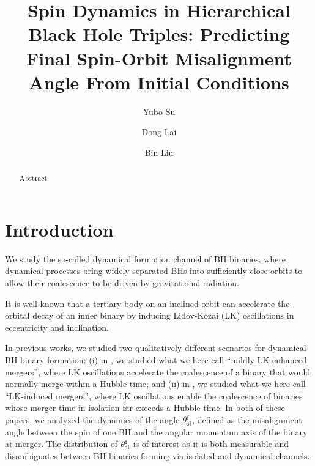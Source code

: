 \documentclass[
        twocolumn,
        twocolappendix
    ]{aastex63}
\begin{document}
\title{Spin Dynamics in Hierarchical Black Hole Triples: Predicting Final
Spin-Orbit Misalignment Angle From Initial Conditions}


\author[0000-0001-8283-3425]{Yubo Su}%

\author[0000-0002-1934-6250]{Dong Lai}%

\author[0000-0002-0643-8295]{Bin Liu}%

\begin{abstract}
    Abstract
\end{abstract}


\section{Introduction}\label{s:intro}

We study the so-called dynamical formation channel of BH binaries, where
dynamical processes bring widely separated BHs into sufficiently close orbits to
allow their coalescence to be driven by gravitational radiation.

It is well known that a tertiary body on an inclined orbit can accelerate the
orbital decay of an inner binary by inducing Lidov-Kozai (LK) oscillations in
eccentricity and inclination\citep{kozai,lidov}.

In previous works, we studied two qualitatively different scenarios for
dynamical BH binary formation: (i) in \citet{bin1}, we studied what we here call
``mildly LK-enhanced mergers'', where LK oscillations accelerate the coalescence
of a binary that would normally merge within a Hubble time; and (ii) in
\citet{bin2}, we studied what we here call ``LK-induced mergers'', where LK
oscillations enable the coalescence of binaries whose merger time in isolation
far exceeds a Hubble time. In both of these papers, we analyzed the dynamics of
the angle $\theta_{\rm sl}^{\rm f}$, defined as the misalignment angle between
the spin of one BH and the angular momentum axis of the binary at merger. The
distribution of $\theta_{\rm sl}^{\rm f}$ is of interest as it is both
measurable and disambiguates between BH binaries forming via isolated and
dynamical channels.
\end{document}
